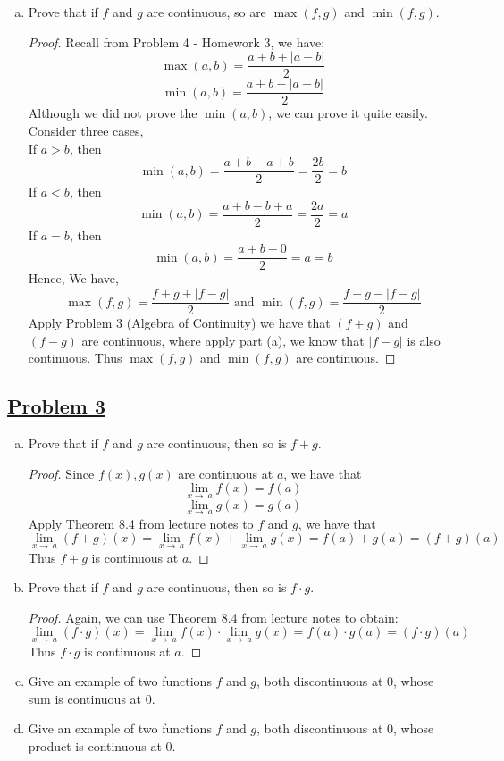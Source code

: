 \documentclass[10pt,letterpaper]{article}
\begin{document}
\begin{enumerate}[(a)]
\begin{proof}
	\end{proof} 
	\item Prove that if $f$ and $g$ are continuous, so are $\max(f, g)$ and $\min(f, g)$.
	\begin{proof}
		Recall from Problem 4 - Homework 3, we have:
		$$\max(a, b) = \dfrac{a + b + |a - b|}{2}$$
		$$\min(a, b) = \dfrac{a + b - |a - b|}{2}$$
		Although we did not prove the $\min(a, b)$, we can prove it quite easily. 
		Consider three cases, \\
		If $a > b$, then 
			$$\min(a, b) = \dfrac{a + b - a + b}{2} = \dfrac{2b}{2} = b$$
		If $a < b$, then
			$$\min(a, b) = \dfrac{a + b - b + a}{2} = \dfrac{2a}{2} = a$$
		If $a = b$, then 
		 	$$\min(a, b) = \dfrac{a + b - 0}{2} = a = b$$  		
		Hence,
		We have,
			$$\max(f, g) = \dfrac{f + g + |f - g|}{2} \text{ and } \min(f, g) = \dfrac{f + g - |f - g|}{2}$$
		Apply Problem 3 (Algebra of Continuity) we have that $(f + g)$ and $(f - g)$ are continuous, where 
		apply part (a), we know that $|f - g|$ is also continuous. Thus $\max(f, g)$ and $\min(f, g)$ are
		continuous.
	\end{proof}		
	
	
	\end{enumerate}
	
	\subsection*{{\color{purple}\underline{Problem 3}}}
	\begin{enumerate}[(a)]
	\item Prove that if $f$ and $g$ are continuous, then so is $f + g$.
	\begin{proof}
		Since $f(x), g(x)$ are continuous at $a$, we have that
		$$\displaystyle\lim_{x\to\ a}f(x) = f(a)$$
		$$\displaystyle\lim_{x\to\ a}g(x) = g(a)$$
		Apply Theorem 8.4 from lecture notes to $f$ and $g$, we have that
		$$\displaystyle\lim_{x\to\ a}(f + g)(x) = 
		\displaystyle\lim_{x\to\ a}f(x) + \displaystyle\lim_{x\to\ a}g(x)
		= f(a) + g(a) = (f + g)(a)$$
		Thus $f + g$ is continuous at $a$.
	\end{proof}
	
	\item Prove that if $f$ and $g$ are continuous, then so is $f \cdot g$.
	\begin{proof}
		Again, we can use Theorem 8.4 from lecture notes to obtain:
		$$\displaystyle\lim_{x\to\ a}(f \cdot g)(x) = 
		\displaystyle\lim_{x\to\ a}f(x) \cdot \displaystyle\lim_{x\to\ a}g(x)
		= f(a) \cdot g(a) = (f \cdot g)(a)$$
		Thus $f \cdot g$ is continuous at $a$.
	\end{proof}
	
	\item Give an example of two functions $f$ and $g$, both discontinuous at 0, whose sum is continuous at 0.
	
	
	\item Give an example of two functions $f$ and $g$, both discontinuous at 0, whose product is continuous at 0.
	\end{enumerate}
	
\end{document}

